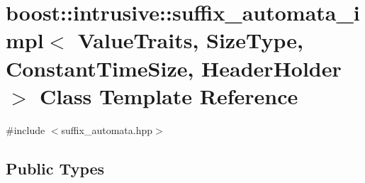 \hypertarget{classboost_1_1intrusive_1_1suffix__automata__impl}{}\section{boost\+:\+:intrusive\+:\+:suffix\+\_\+automata\+\_\+impl$<$ Value\+Traits, Size\+Type, Constant\+Time\+Size, Header\+Holder $>$ Class Template Reference}
\label{classboost_1_1intrusive_1_1suffix__automata__impl}


{\ttfamily \#include $<$suffix\+\_\+automata.\+hpp$>$}

\subsection*{Public Types}
